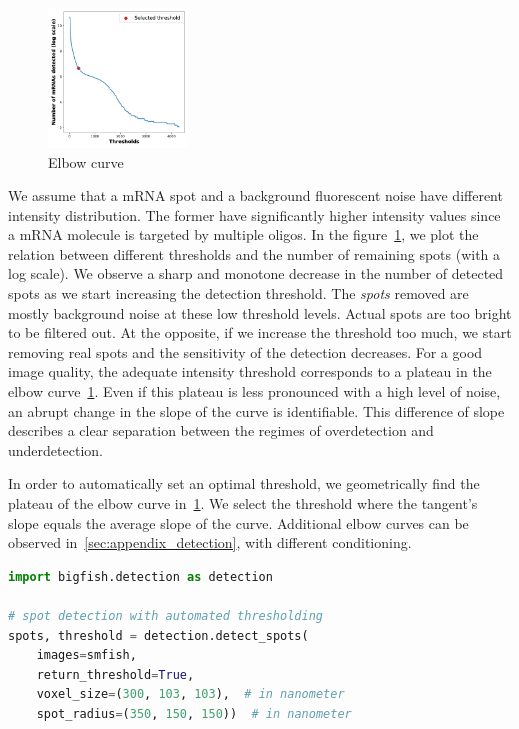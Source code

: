\begin{figure}
  \begin{center}
    \includegraphics[width=0.33\textwidth]{figures/chapter2/elbow_curve_real}
  \end{center}
  \caption{Elbow curve}
  \label{fig:elbow_detection}
\end{figure}

We assume that a \ac{mRNA} spot and a background fluorescent noise have different intensity distribution.
The former have significantly higher intensity values since a \ac{mRNA} molecule is targeted by multiple oligos.
In the figure~\ref{fig:elbow_detection}, we plot the relation between different thresholds and the number of remaining spots (with a log scale).
We observe a sharp and monotone decrease in the number of detected spots as we start increasing the detection threshold.
The \emph{spots} removed are mostly background noise at these low threshold levels.
Actual spots are too bright to be filtered out.
At the opposite, if we increase the threshold too much, we start removing real spots and the sensitivity of the detection decreases.
For a good image quality, the adequate intensity threshold corresponds to a plateau in the elbow curve~\ref{fig:elbow_detection}.
Even if this plateau is less pronounced with a high level of noise, an abrupt change in the slope of the curve is identifiable.
This difference of slope describes a clear separation between the regimes of overdetection and underdetection.

In order to automatically set an optimal threshold, we geometrically find the plateau of the elbow curve in~\ref{fig:elbow_detection}.
We select the threshold where the tangent's slope equals the average slope of the curve.
Additional elbow curves can be observed in~\ref{sec:appendix_detection}, with different conditioning.\\

\begin{minipage}{0.9\textwidth}
\begin{lstlisting}[language=Python]
import bigfish.detection as detection

# spot detection with automated thresholding
spots, threshold = detection.detect_spots(
    images=smfish,
    return_threshold=True,
    voxel_size=(300, 103, 103),  # in nanometer
    spot_radius=(350, 150, 150))  # in nanometer
\end{lstlisting}
\end{minipage}

